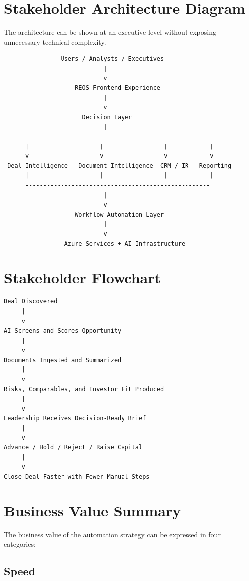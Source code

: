 \documentclass[11pt]{article}
\begin{document}
\section{Stakeholder Architecture Diagram}

The architecture can be shown at an executive level without exposing unnecessary technical complexity.

\begin{verbatim}
                Users / Analysts / Executives
                            |
                            v
                    REOS Frontend Experience
                            |
                            v
                      Decision Layer
                            |
      ----------------------------------------------------
      |                    |                 |            |
      v                    v                 v            v
 Deal Intelligence   Document Intelligence  CRM / IR   Reporting
      |                    |                 |            |
      ----------------------------------------------------
                            |
                            v
                    Workflow Automation Layer
                            |
                            v
                 Azure Services + AI Infrastructure
\end{verbatim}

\section{Stakeholder Flowchart}

\begin{verbatim}
Deal Discovered
     |
     v
AI Screens and Scores Opportunity
     |
     v
Documents Ingested and Summarized
     |
     v
Risks, Comparables, and Investor Fit Produced
     |
     v
Leadership Receives Decision-Ready Brief
     |
     v
Advance / Hold / Reject / Raise Capital
     |
     v
Close Deal Faster with Fewer Manual Steps
\end{verbatim}

\section{Business Value Summary}

The business value of the automation strategy can be expressed in four categories:

\subsection{Speed}
\end{document}
